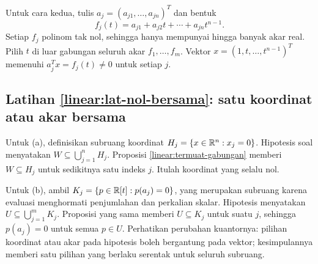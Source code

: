     Untuk cara kedua, tulis $a_j=(a_{j1},\ldots,a_{jn})^T$ dan bentuk
    \[
        f_j(t)=a_{j1}+a_{j2}t+\cdots+a_{jn}t^{n-1}.
    \]
    Setiap $f_j$ polinom tak nol, sehingga hanya mempunyai hingga
    banyak akar real. Pilih $t$ di luar gabungan seluruh akar
    $f_1,\ldots,f_m$. Vektor $x=(1,t,\ldots,t^{n-1})^T$
    memenuhi $a_j^Tx=f_j(t)\ne0$ untuk setiap $j$.

    \subsection*{Latihan \ref{linear:lat-nol-bersama}: satu koordinat atau akar bersama}
    Untuk (a), definisikan subruang koordinat
    $H_j=\{x\in\mathbb{R}^n:x_j=0\}$.
    Hipotesis soal menyatakan $W\subseteq\bigcup_{j=1}^n H_j$.
    Proposisi \ref{linear:termuat-gabungan} memberi $W\subseteq H_j$
    untuk sedikitnya satu indeks $j$. Itulah koordinat yang selalu nol.

    Untuk (b), ambil $K_j=\{p\in\mathbb{R}[t]:p(a_j)=0\}$, yang merupakan
    subruang karena evaluasi menghormati penjumlahan dan perkalian skalar.
    Hipotesis menyatakan $U\subseteq\bigcup_{j=1}^m K_j$.
    Proposisi yang sama memberi $U\subseteq K_j$ untuk suatu $j$,
    sehingga $p(a_j)=0$ untuk semua $p\in U$.
    Perhatikan perubahan kuantornya: pilihan koordinat atau akar
    pada hipotesis boleh bergantung pada vektor; kesimpulannya memberi
    satu pilihan yang berlaku serentak untuk seluruh subruang.
\fi
